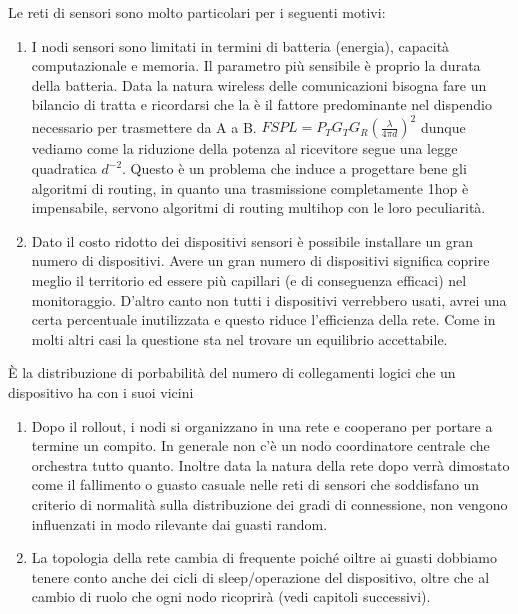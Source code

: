 \documentclass[letterpaper,10pt,english]{jupyterBook}
\begin{document}
\sphinxAtStartPar
Le reti di sensori sono molto particolari per i seguenti motivi:
\begin{enumerate}
%
\item {} 
\sphinxAtStartPar
I nodi sensori sono limitati in termini di batteria (energia), capacità computazionale e memoria. Il parametro più
sensibile è proprio la durata della batteria. Data la natura wireless delle comunicazioni bisogna fare un bilancio di
tratta e ricordarsi che la  è il fattore predominante nel dispendio necessario per trasmettere da A a B.
\( FSPL = P_T G_T G_R (\frac{λ}{4πd})^2 \)  dunque vediamo come la riduzione della potenza al ricevitore segue una legge
quadratica \( d^{-2} \). Questo è un problema che induce a progettare bene gli algoritmi di routing, in quanto una trasmissione
completamente 1\sphinxhyphen{}hop è impensabile, servono algoritmi di routing multi\sphinxhyphen{}hop con le loro peculiarità.

\item {} 
\sphinxAtStartPar
Dato il costo ridotto dei dispositivi sensori è possibile installare un gran numero di dispositivi. Avere un gran numero
di dispositivi significa coprire meglio il territorio ed essere più capillari (e di conseguenza efficaci) nel monitoraggio.
D’altro canto non tutti i dispositivi verrebbero usati, avrei una certa percentuale inutilizzata e questo riduce l’efficienza
della rete. Come in molti altri casi la questione sta nel trovare un equilibrio accettabile.

\end{enumerate}

\begin{sphinxShadowBox}

\sphinxAtStartPar
È la distribuzione di porbabilità del numero di collegamenti logici che un dispositivo ha con i suoi vicini
\end{sphinxShadowBox}
\begin{enumerate}
%
\item {} 
\sphinxAtStartPar
Dopo il rollout, i nodi si organizzano in una rete e cooperano per portare a termine un compito. In generale non c’è
un nodo coordinatore centrale che orchestra tutto quanto. Inoltre data la natura della rete dopo verrà dimostato come il
fallimento o guasto casuale nelle reti di sensori che soddisfano un criterio di normalità sulla distribuzione dei gradi
di connessione, non vengono influenzati in modo rilevante dai guasti random.

\item {} 
\sphinxAtStartPar
La topologia della rete cambia di frequente poiché oiltre ai guasti dobbiamo tenere conto anche dei cicli di
sleep/operazione del dispositivo, oltre che al cambio di ruolo che ogni nodo ricoprirà (vedi capitoli successivi).

\end{enumerate}
\end{document}
